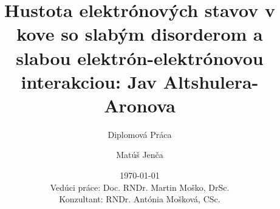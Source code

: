 \documentclass[
	11pt, %
]{beamer}
\title[Diplomová práca]{ Hustota elektrónových stavov v kove so slabým disorderom a slabou elektrón-elektrónovou interakciou: Jav Altshulera-Aronova} %
\subtitle{Diplomová Práca} %
\author[Matúš Jenča]{Matúš Jenča} %
\institute[FMFI UK]{Fakulta matematiky, Fyziky a Informatiky } %
\date[\today]{\today  \\
\tiny
\vspace{10mm}
Vedúci práce:  Doc. RNDr. Martin Moško, DrSc. \\
Konzultant: RNDr. Antónia Mošková, CSc. \\
\normalsize} %
\begin{document}

\begin{frame}
	\titlepage %
\end{frame}


\end{document}
